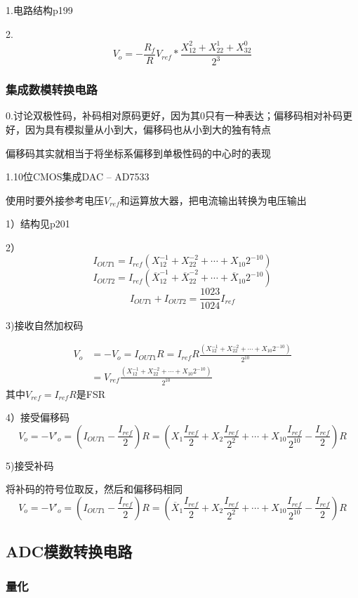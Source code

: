 \documentclass[11pt,twoside,a4paper]{ctexart}
\begin{document}
1.电路结构p199

2.
\[V_o = -\frac{R_f}{R}V_{ref} * \frac{X_12^2 + X_22^1 + X_32^0}{2^3}\]

\subsubsection{集成数模转换电路}

0.讨论双极性码，补码相对原码更好，因为其0只有一种表达；偏移码相对补码更好，因为具有模拟量从小到大，偏移码也从小到大的独有特点

偏移码其实就相当于将坐标系偏移到单极性码的中心时的表现

1.10位CMOS集成DAC -- AD7533

使用时要外接参考电压$V_{ref}$和运算放大器，把电流输出转换为电压输出

1）结构见p201

2）
\[I_{OUT1} = I_{ref}(X_12^{-1} + X_22^{-2} + \cdots + X_{10}2^{-10})\]
\[I_{OUT2} = I_{ref}(\overline{X}_12^{-1} + \overline{X}_22^{-2} + \cdots +\overline{X}_{10}2^{-10})\]
\[I_{OUT1} + I_{OUT2} = \frac{1023}{1024}I_{ref}\]

3)接收自然加权码

\begin{align}
    V_o & =-V_o = I_{OUT1}R = I_{ref}R\frac{(X_12^{-1} + X_22^{-2} + \cdots + X_{10}2^{-10})}{2^{10}} \\
    & = V_{ref}\frac{(X_12^{-1} + X_22^{-2} + \cdots + X_{10}2^{-10})}{2^{10}}
\end{align}
其中$V_{ref} = I_{ref}R$是FSR

4）接受偏移码
\[V_o = -V'_o = (I_{OUT1} - \frac{I_{ref}}{2})R = (X_1\frac{I_{ref}}{2} + X_2\frac{I_{ref}}{2^2} + \cdots + X_{10}\frac{I_{ref}}{2^{10}} - \frac{I_{ref}}{2})R\]

5)接受补码

将补码的符号位取反，然后和偏移码相同
\[V_o = -V'_o = (I_{OUT1} - \frac{I_{ref}}{2})R = (\overline{X}_1\frac{I_{ref}}{2} + X_2\frac{I_{ref}}{2^2} + \cdots + X_{10}\frac{I_{ref}}{2^{10}} - \frac{I_{ref}}{2})R\]

\subsection{ADC模数转换电路}

\subsubsection{量化}
\end{document}
